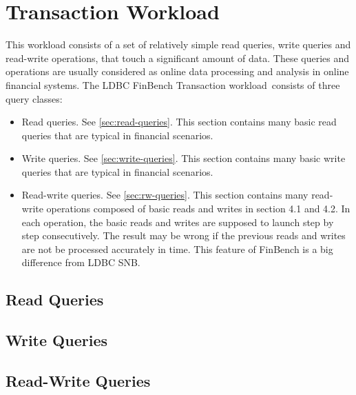 \chapter{Transaction Workload}
\label{section:transaction-workload}

This workload consists of a set of relatively simple read queries, write queries
and read-write operations, that touch a significant amount of data. These
queries and operations are usually considered as online data processing and
analysis in online financial systems. The LDBC FinBench Transaction workload\
consists of three query classes: 
\begin{itemize}
    \item Read queries. See \autoref{sec:read-queries}. This section contains many basic read
    queries that are typical in financial scenarios.
    \item Write queries. See \autoref{sec:write-queries}. This section contains many basic
    write queries that are typical in financial scenarios.
    \item Read-write queries. See \autoref{sec:rw-queries}. This section contains many
    read-write operations composed of basic reads and writes in section 4.1 and
    4.2. In each operation, the basic reads and writes are supposed to launch
    step by step consecutively. The result may be wrong if the previous reads
    and writes are not be processed accurately in time. This feature of FinBench
    is a big difference from LDBC SNB.
\end{itemize}

\section{Read Queries}
\label{sec:read-queries}




\section{Write Queries}
\label{sec:write-queries}




\section{Read-Write Queries}
\label{sec:rw-queries}



